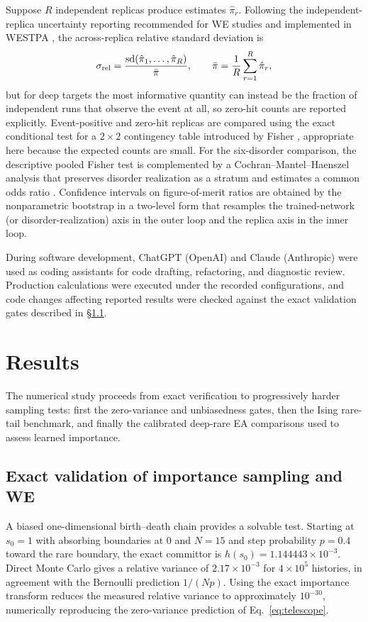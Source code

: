 \documentclass[a4paper,fleqn]{cas-sc}
\begin{document}
Suppose $R$ independent replicas produce estimates $\hat\pi_r$. Following the
independent-replica uncertainty reporting recommended for WE studies \citep{zuckerman2017} and
implemented in WESTPA \citep{russo2022}, the across-replica relative standard deviation is
\begin{equation}
\sigma_{\rm rel}=\frac{\mathrm{sd}(\hat\pi_1,\dots,\hat\pi_R)}{\bar\pi},\qquad
\bar\pi=\frac1R\sum_{r=1}^{R}\hat\pi_r ,
\label{eq:relsd}
\end{equation}
but for deep targets the most informative quantity can instead be the fraction of independent
runs that observe the event at all, so zero-hit counts are reported explicitly. Event-positive
and zero-hit replicas are compared using the exact conditional test for a $2\times2$
contingency table introduced by Fisher \citep{fisher1922}, appropriate here because the
expected counts are small. For the six-disorder comparison, the descriptive pooled Fisher test is
complemented by a Cochran--Mantel--Haenszel analysis that preserves disorder realization as a
stratum and estimates a common odds ratio \citep{mantel1959}. Confidence intervals on
figure-of-merit ratios are obtained by the nonparametric bootstrap \citep{efron1979} in a
two-level form that resamples the trained-network (or disorder-realization) axis in the outer
loop and the replica axis in the inner loop.

During software development, ChatGPT (OpenAI) and Claude (Anthropic) were used as coding
assistants for code drafting, refactoring, and diagnostic review. Production calculations were
executed under the recorded configurations, and code changes affecting reported results were
checked against the exact validation gates described in \S\ref{sec:validation}.

\FloatBarrier

\section{Results}\label{sec:results}

The numerical study proceeds from exact verification to progressively harder sampling tests:
first the zero-variance and unbiasedness gates, then the Ising rare-tail benchmark, and finally
the calibrated deep-rare EA comparisons used to assess learned importance.

\subsection{Exact validation of importance sampling and WE}\label{sec:validation}\label{sec:bd}
A biased one-dimensional birth--death chain provides a solvable test. Starting at $s_0=1$
with absorbing boundaries at $0$ and $N=15$ and step probability $p=0.4$ toward the rare
boundary, the exact committor is $h(s_0)=1.144443\times10^{-3}$. Direct Monte Carlo gives a
relative variance of $2.17\times10^{-3}$ for $4\times10^{5}$ histories, in agreement with the
Bernoulli prediction $1/(Np)$. Using the exact importance transform reduces the measured
relative variance to approximately $10^{-30}$, numerically reproducing the zero-variance
prediction of Eq.~\eqref{eq:telescope}.
\end{document}
